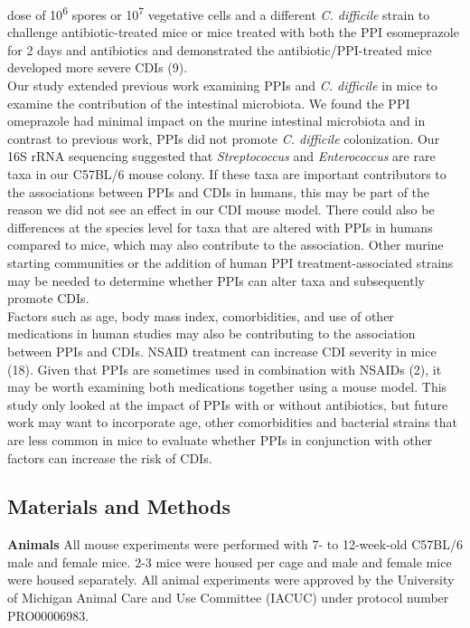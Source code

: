 \documentclass[11pt,]{article}
\begin{document}
dose of 10\textsuperscript{6} spores or 10\textsuperscript{7} vegetative
cells and a different \emph{C. difficile} strain to challenge
antibiotic-treated mice or mice treated with both the PPI esomeprazole
for 2 days and antibiotics and demonstrated the antibiotic/PPI-treated
mice developed more severe CDIs (9).\\
Our study extended previous work examining PPIs and \emph{C. difficile}
in mice to examine the contribution of the intestinal microbiota. We
found the PPI omeprazole had minimal impact on the murine intestinal
microbiota and in contrast to previous work, PPIs did not promote
\emph{C. difficile} colonization. Our 16S rRNA sequencing suggested that
\emph{Streptococcus} and \emph{Enterococcus} are rare taxa in our
C57BL/6 mouse colony. If these taxa are important contributors to the
associations between PPIs and CDIs in humans, this may be part of the
reason we did not see an effect in our CDI mouse model. There could also
be differences at the species level for taxa that are altered with PPIs
in humans compared to mice, which may also contribute to the
association. Other murine starting communities or the addition of human
PPI treatment-associated strains may be needed to determine whether PPIs
can alter taxa and subsequently promote CDIs.\\
Factors such as age, body mass index, comorbidities, and use of other
medications in human studies may also be contributing to the association
between PPIs and CDIs. NSAID treatment can increase CDI severity in mice
(18). Given that PPIs are sometimes used in combination with NSAIDs (2),
it may be worth examining both medications together using a mouse model.
This study only looked at the impact of PPIs with or without
antibiotics, but future work may want to incorporate age, other
comorbidities and bacterial strains that are less common in mice to
evaluate whether PPIs in conjunction with other factors can increase the
risk of CDIs.

\subsection{Materials and Methods}\label{materials-and-methods}

\textbf{Animals} All mouse experiments were performed with 7- to
12-week-old C57BL/6 male and female mice. 2-3 mice were housed per cage
and male and female mice were housed separately. All animal experiments
were approved by the University of Michigan Animal Care and Use
Committee (IACUC) under protocol number PRO00006983.
\end{document}
